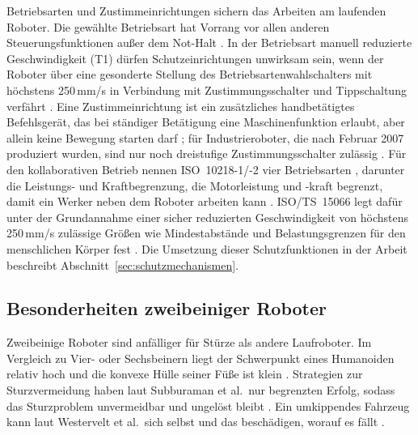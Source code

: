 Betriebsarten und Zustimmeinrichtungen sichern das Arbeiten am laufenden Roboter.
Die gewählte Betriebsart hat Vorrang vor allen anderen Steuerungsfunktionen außer dem Not-Halt \cite{MRL2006}.
In der Betriebsart manuell reduzierte Geschwindigkeit (T1) dürfen Schutzeinrichtungen unwirksam sein, wenn der Roboter über eine gesonderte Stellung des Betriebsartenwahlschalters mit höchstens 250\,mm/s in Verbindung mit Zustimmungsschalter und Tippschaltung verfährt \cite{DGUV2015}.
Eine Zustimmeinrichtung ist ein zusätzliches handbetätigtes Befehlsgerät, das bei ständiger Betätigung eine Maschinenfunktion erlaubt, aber allein keine Bewegung starten darf \cite{DGUV2015}; für Industrieroboter, die nach Februar 2007 produziert wurden, sind nur noch dreistufige Zustimmungsschalter zulässig \cite{DGUV2015}.
Für den kollaborativen Betrieb nennen ISO~10218-1/-2 vier Betriebsarten \cite{Villani2018}, darunter die Leistungs- und Kraftbegrenzung, die Motorleistung und -kraft begrenzt, damit ein Werker neben dem Roboter arbeiten kann \cite{Villani2018}.
ISO/TS~15066 legt dafür unter der Grundannahme einer sicher reduzierten Geschwindigkeit von höchstens 250\,mm/s zulässige Größen wie Mindestabstände und Belastungsgrenzen für den menschlichen Körper fest \cite{Villani2018}.
Die Umsetzung dieser Schutzfunktionen in der Arbeit beschreibt Abschnitt~\ref{sec:schutzmechanismen}.

\subsection{Besonderheiten zweibeiniger Roboter}
\label{sec:sicherheit_zweibeiner}
Zweibeinige Roboter sind anfälliger für Stürze als andere Laufroboter.
Im Vergleich zu Vier- oder Sechsbeinern liegt der Schwerpunkt eines Humanoiden relativ hoch und die konvexe Hülle seiner Füße ist klein \cite{Subburaman2023}.
Strategien zur Sturzvermeidung haben laut Subburaman et al.\ nur begrenzten Erfolg, sodass das Sturzproblem unvermeidbar und ungelöst bleibt \cite{Subburaman2023}.
Ein umkippendes Fahrzeug kann laut Westervelt et al.\ sich selbst und das beschädigen, worauf es fällt \cite{Westervelt2018}.

